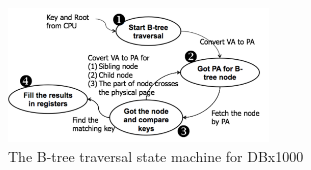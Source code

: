 \begin{figure}[t]
  \centering
  \includegraphics[height=1.4in]{figures/btree_state_machine.pdf}
  \caption{The B-tree traversal state machine for DBx1000}
  \label{fig:btree_state_machine}
\end{figure}

